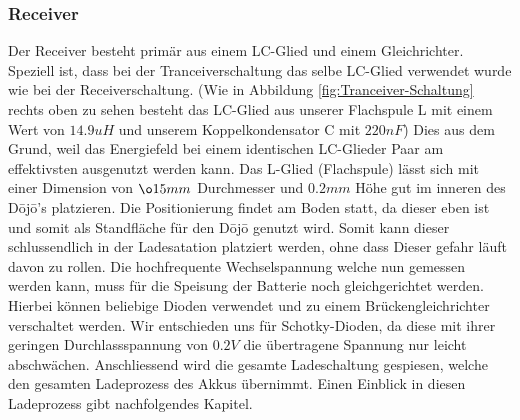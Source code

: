 \subsubsection*{Receiver}
Der Receiver besteht primär aus einem LC-Glied und einem Gleichrichter. Speziell ist, dass bei der Tranceiverschaltung das selbe LC-Glied verwendet wurde wie bei der Receiverschaltung. (Wie in Abbildung \ref{fig:Tranceiver-Schaltung} rechts oben zu sehen besteht das LC-Glied aus unserer Flachspule L mit einem Wert von $14.9uH$ und unserem Koppelkondensator C mit $220nF$)  Dies aus dem Grund, weil das Energiefeld bei einem identischen LC-Glieder Paar am effektivsten ausgenutzt werden kann. Das L-Glied (Flachspule) lässt sich mit einer Dimension von $\o 15mm$ Durchmesser und $0.2mm$ Höhe gut im inneren des Dōjō’s platzieren. Die Positionierung findet am Boden statt, da dieser eben ist und somit als Standfläche für den Dōjō genutzt wird. Somit kann dieser schlussendlich in der Ladesatation platziert werden, ohne dass Dieser gefahr läuft davon zu rollen. Die hochfrequente Wechselspannung welche nun gemessen werden kann, muss für die Speisung der Batterie noch gleichgerichtet werden. Hierbei können beliebige Dioden verwendet  und zu einem Brückengleichrichter verschaltet werden. Wir entschieden uns für Schotky-Dioden, da diese mit ihrer geringen Durchlassspannung von $0.2V$ die übertragene Spannung nur leicht abschwächen. Anschliessend wird die gesamte Ladeschaltung gespiesen, welche den gesamten Ladeprozess des Akkus übernimmt. Einen Einblick in diesen Ladeprozess gibt nachfolgendes Kapitel.

